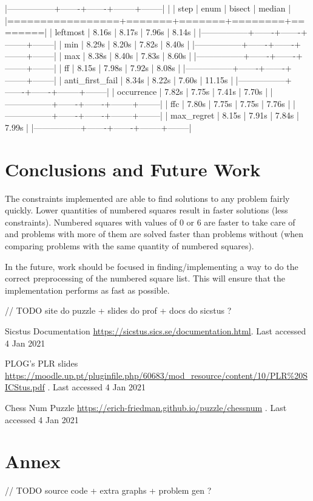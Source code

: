\documentclass[runningheads]{llncs}
\begin{document}
|-----------------+-------+-------+--------+--------|
|                 | step  | enum  | bisect | median |
|=================+=======+=======+========+========|
| leftmost        | 8.16s | 8.17s | 7.96s  | 8.14s  |
|-----------------+-------+-------+--------+--------|
| min             | 8.29s | 8.20s | 7.82s  | 8.40s  |
|-----------------+-------+-------+--------+--------|
| max             | 8.38s | 8.40s | 7.83s  | 8.60s  |
|-----------------+-------+-------+--------+--------|
| ff              | 8.15s | 7.98s | 7.92s  | 8.08s  |
|-----------------+-------+-------+--------+--------|
| anti_first_fail | 8.34s | 8.22s | 7.60s  | 11.15s |
|-----------------+-------+-------+--------+--------|
| occurrence      | 7.82s | 7.75s | 7.41s  | 7.70s  |
|-----------------+-------+-------+--------+--------|
| ffc             | 7.80s | 7.75s | 7.75s  | 7.76s  |
|-----------------+-------+-------+--------+--------|
| max_regret      | 8.15s | 7.91s | 7.84s  | 7.99s  |
|-----------------+-------+-------+--------+--------|

\section{Conclusions and Future Work}
The constraints implemented are able to find solutions to any problem fairly
quickly. Lower quantities of numbered squares result in faster solutions
(less constraints). Numbered squares with values of 0 or 6 are faster to
take care of and problems with more of them are solved faster than problems
without (when comparing problems with the same quantity of numbered squares).

In the future, work should be focused in finding/implementing a way to do the
correct preprocessing of the numbered square list. This will ensure that the
implementation performs as fast as possible.

// TODO site do puzzle + slides do prof + docs do sicstus ?
\begin{thebibliography}{8}

    Sicstus Documentation
        \href{https://sicstus.sics.se/documentation.html}{https://sicstus.sics.se/documentation.html}.
        Last accessed 4 Jan 2021

    PLOG's PLR slides 
    \href{https://moodle.up.pt/pluginfile.php/60683/mod\_resource/content/10/PLR\%20SICStus.pdf}{https://moodle.up.pt/pluginfile.php/60683/mod\_resource/content/10/PLR\%20SICStus.pdf}
    . Last accessed 4 Jan 2021

    Chess Num Puzzle 
    \href{https://erich-friedman.github.io/puzzle/chessnum}{https://erich-friedman.github.io/puzzle/chessnum}
    . Last accessed 4 Jan 2021
\end{thebibliography}

\section{Annex}

// TODO source code + extra graphs + problem gen ?
\end{document}
